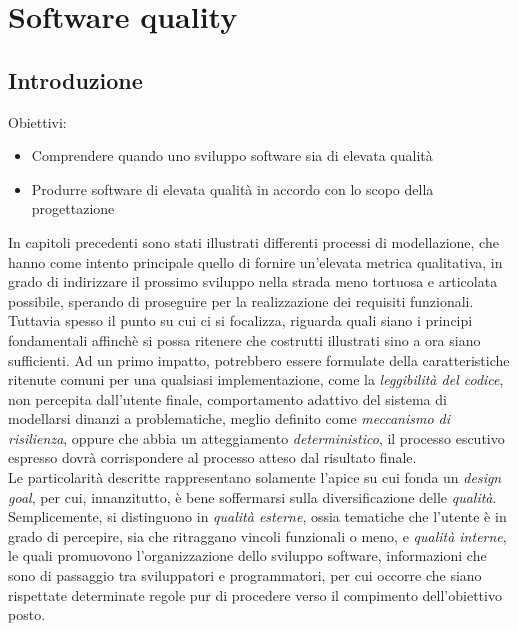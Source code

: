 \documentclass{article}
\begin{document}
\pagestyle{empty}
\section*{Software quality}
\large

\subsection*{Introduzione}
\large
Obiettivi:
\begin{itemize}
    \renewcommand{\labelitemi}{-}
    \itemsep0em
    \item Comprendere quando uno sviluppo software sia di elevata qualità
    \item Produrre software di elevata qualità in accordo con lo scopo della progettazione 
\end{itemize}
In capitoli precedenti sono stati illustrati differenti processi di modellazione, che hanno come intento principale quello di fornire un'elevata metrica qualitativa, in grado di indirizzare il prossimo sviluppo nella strada meno tortuosa e articolata possibile, sperando di proseguire per la realizzazione dei requisiti funzionali.\vspace*{14pt}\\
Tuttavia spesso il punto su cui ci si focalizza, riguarda quali siano i principi fondamentali affinchè si possa ritenere che costrutti illustrati sino a ora siano sufficienti. Ad un primo impatto, potrebbero essere formulate della caratteristiche ritenute comuni per una qualsiasi implementazione, come la \textit{leggibilità del codice}, non percepita dall'utente finale, comportamento adattivo del sistema di modellarsi dinanzi a problematiche, meglio definito come \textit{meccanismo di risilienza}, oppure che abbia un atteggiamento \textit{deterministico}, il processo escutivo espresso dovrà corrispondere al processo atteso dal risultato finale.\vspace*{14pt}\\
Le particolarità descritte rappresentano solamente l'apice su cui fonda un \textit{design goal}, per cui, innanzitutto, è bene soffermarsi sulla diversificazione delle \textit{qualità}.\vspace*{14pt}\\
Semplicemente, si distinguono in \textit{qualità esterne}, ossia tematiche che l'utente è in grado di percepire, sia che ritraggano vincoli funzionali o meno, e \textit{qualità interne}, le quali promuovono l'organizzazione dello sviluppo software, informazioni che sono di passaggio tra sviluppatori e programmatori, per cui occorre che siano rispettate determinate regole pur di procedere verso il compimento dell'obiettivo posto.\vspace*{14pt}\\
\end{document}
